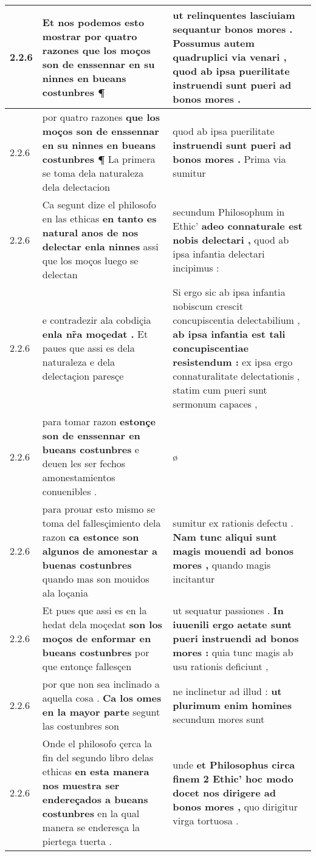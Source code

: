 \begin{tabular}{|p{1cm}|p{6.5cm}|p{6.5cm}|}
2.2.6 & Et nos podemos esto mostrar \textbf{ por quatro razones } que los moços son de enssennar en su ninnes en bueans costunbres ¶ & ut relinquentes lasciuiam sequantur bonos mores . Possumus autem quadruplici via venari , \textbf{ quod ab ipsa puerilitate } instruendi sunt pueri ad bonos mores . \\\hline
2.2.6 & por quatro razones \textbf{ que los moços son de enssennar en su ninnes en bueans costunbres ¶ } La primera se toma dela naturaleza dela delectacion & quod ab ipsa puerilitate \textbf{ instruendi sunt pueri ad bonos mores . } Prima via sumitur \\\hline
2.2.6 & Ca segunt dize el philosofo en las ethicas \textbf{ en tanto es natural anos de nos delectar enla ninnes } assi que los moços luego se delectan & secundum Philosophum in Ethic’ \textbf{ adeo connaturale est nobis delectari , } quod ab ipsa infantia delectari incipimus : \\\hline
2.2.6 & e contradezir ala cobdiçia \textbf{ enla nr̃a moçedat . } Et paues que assi es dela naturaleza e dela delectaçion paresçe & Si ergo sic ab ipsa infantia nobiscum crescit concupiscentia delectabilium , \textbf{ ab ipsa infantia est tali concupiscentiae resistendum : } ex ipsa ergo connaturalitate delectationis , statim cum pueri sunt sermonum capaces , \\\hline
2.2.6 & para tomar razon \textbf{ estonçe son de enssennar en bueans costunbres } e deuen les ser fechos amonestamientos conuenibles . & ø \\\hline
2.2.6 & para prouar esto mismo se toma del fallesçimiento dela razon \textbf{ ca estonce son algunos de amonestar a buenas costunbres } quando mas son mouidos ala loçania & sumitur ex rationis defectu . \textbf{ Nam tunc aliqui sunt magis mouendi ad bonos mores , } quando magis incitantur \\\hline
2.2.6 & Et pues que assi es en la hedat dela moçedat \textbf{ son los moços de enformar en bueans costunbres } por que entonçe fallesçen & ut sequatur passiones . \textbf{ In iuuenili ergo aetate sunt pueri instruendi ad bonos mores : } quia tunc magis ab usu rationis deficiunt , \\\hline
2.2.6 & por que non sea inclinado a aquella cosa . \textbf{ Ca los omes en la mayor parte } segunt las costunbres son & ne inclinetur ad illud : \textbf{ ut plurimum enim homines } secundum mores sunt \\\hline
2.2.6 & Onde el philosofo çerca la fin del segundo libro delas ethicas \textbf{ en esta manera nos muestra ser endereçados a bueans costunbres } en la qual manera se enderesça la piertega tuerta . & unde \textbf{ et Philosophus circa finem 2 Ethic’ hoc modo docet nos dirigere ad bonos mores , } quo dirigitur virga tortuosa . \\\hline

\end{tabular}
